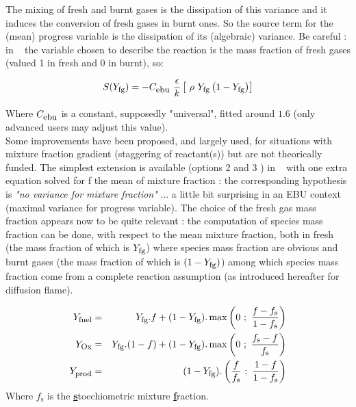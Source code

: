 The mixing of fresh and burnt gases is the dissipation of this variance and it
induces the conversion of fresh gases in burnt ones. So the source term for the
(mean) progress variable is the dissipation of its (algebraic) variance. Be
careful : in \CS~ the variable chosen to describe the reaction is the mass
fraction of fresh gases (valued 1 in fresh and 0 in burnt), so:
 
\begin{equation}
S(Y_{\mbox{\footnotesize fg}}) = - C_{\mbox{\small ebu}}~\frac{\epsilon}{k} \displaystyle\left[~\rho ~Y_{\mbox{\footnotesize fg}} \left(1-Y_{\mbox{\footnotesize fg}}\right)\right]
\end{equation}
  
Where $C_{\mbox{\small ebu}}$ is a constant, supposedly "universal", fitted
around $1.6$ (only advanced users may adjust this value).\\
Some improvements have been proposed, and largely used, for situations with
mixture fraction gradient (staggering of reactant(s)) but are not theorically
funded. The simplest extension is available (options 2 and 3 ) in \CS~ with one
extra equation solved for f the mean of mixture fraction : the corresponding
hypothesis is \textit{"no variance for mixture fraction"} ... a little bit
surprising in an EBU context (maximal variance for progress variable). The
choice of the fresh gas mass fraction appears now to be quite relevant : the
computation of species mass fraction can be done, with respect to the mean
mixture fraction, both in fresh (the mass fraction of which is
$Y_{\mbox{\footnotesize fg}}$) where species mass fraction are obvious and burnt
gases (the mass fraction of which is $(1-Y_{\mbox{\footnotesize fg}})$) among
which species mass fraction come from a complete reaction assumption (as
introduced hereafter for diffusion flame).

\begin{eqnarray}
\displaystyle Y_{\mbox{\footnotesize fuel}} &=&     Y_{\mbox{\footnotesize fg}} . f + (1-Y_{\mbox{\footnotesize fg}}) . \max \left(0 ~;~\frac{f- f_{\mbox{\footnotesize s}}}{1-f_{\mbox{\footnotesize s}}}\right)       \nonumber       \\
\displaystyle Y_{\mbox{\footnotesize Ox}}   &=&     Y_{\mbox{\footnotesize fg}} . (1-f) + (1-Y_{\mbox{\footnotesize fg}}) . \max \left(   0 ~;~\frac{f_{\mbox{\footnotesize s}}-f}{f_{\mbox{\footnotesize s}}}\right)   \label{Eq_001a} \\
\displaystyle Y_{\mbox{\footnotesize prod}} &=& (1-Y_{\mbox{\footnotesize fg}}) . \left( \frac{f}{f_{\mbox{\footnotesize s}}}~;~\frac{1-f}{1-f_{\mbox{\footnotesize s}}} \right)                         \nonumber
\end{eqnarray}
Where $f_{\mbox{s}}$ is the \underline{\bf s}toechiometric mixture
\underline{\bf f}raction.

